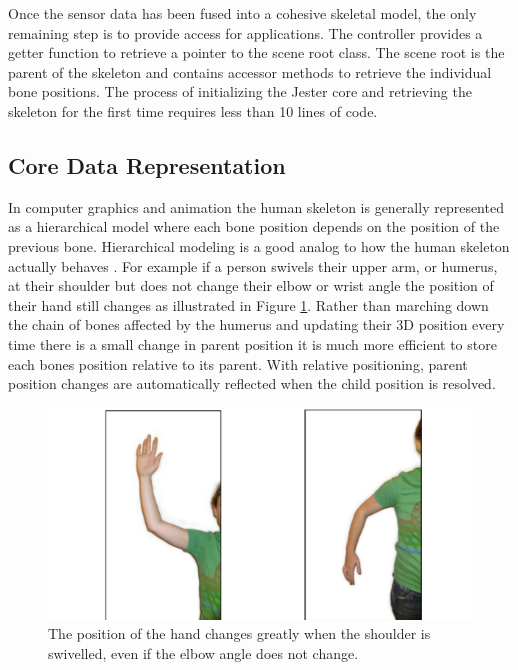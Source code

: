 Once the sensor data has been fused into a cohesive skeletal model, the only remaining step is to provide access for applications. The controller provides a getter function to retrieve a pointer to the scene root class. The scene root is the parent of the skeleton and contains accessor methods to retrieve the individual bone positions. The process of initializing the Jester core and retrieving the skeleton for the first time requires less than 10 lines of code.

\subsection{Core Data Representation}

In computer graphics and animation the human skeleton is generally represented as a hierarchical model where each bone position depends on the position of the previous bone. Hierarchical modeling is a good analog to how the human skeleton actually behaves \cite{parent2012computer}. For example if a person swivels their upper arm, or humerus, at their shoulder but does not change their elbow or wrist angle the position of their hand still changes as illustrated in Figure \ref{fig:arm_swivel}. Rather than marching down the chain of bones affected by the humerus and updating their 3D position every time there is a small change in parent position it is much more efficient to store each bones position relative to its parent. With relative positioning, parent position changes are automatically reflected when the child position is resolved.

\begin{figure}[]
\centering
\includegraphics[width=1\textwidth]{figures/upDownSwivel}
\caption{The position of the hand changes greatly when the shoulder is swivelled, even if the elbow angle does not change.}
\label{fig:arm_swivel}
\end{figure}

